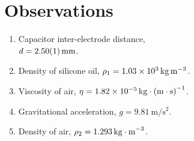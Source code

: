 \documentclass[%
 reprint,
 amsmath,amssymb,
 aps,
]{revtex4-2}
\begin{document}
\section{Observations}
    \begin{enumerate}
        \item Capacitor inter-electrode distance, \\$d = \SI{2.5 \pm 0.01}{\milli \metre}$.
        \item Density of silicone oil, $\rho_1 = \SI{1.03e3}{\kg \raiseto{-3} \metre}$.
        \item Viscosity of air, $\eta = \SI{1.82e-5}{\kg \cdot \raiseto{-1} {(\metre \cdot \second)} }$.
        \item Gravitational acceleration, $g = \SI{9.81}{\metre \per \second \squared}$.
        \item Density of air, $\rho_2 = \SI{1.293}{\kg \cdot \raiseto{-3} \metre}$.
    \end{enumerate}
\end{document}

